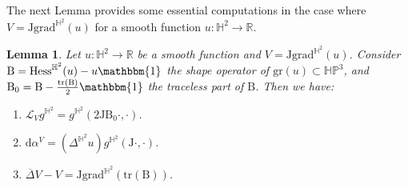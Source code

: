 \documentclass[10pt]{amsart}
\theoremstyle{plain}
\newtheorem{lemma}[cor]{Lemma}
\theoremstyle{definition}
\newcommand{\HP}{\mathbb{HP}^3}
\newcommand{\grad}{\mathrm{grad}^{\mathbb{H}^2}}
\newcommand{\hess}{\mathrm{Hess}^{\mathbb{H}^2}}
\newcommand{\J}{\mathrm{J}}
\newcommand{\B}{\mathrm{B}}
\begin{document}
The next Lemma provides some essential computations in the case where \(V = \J \grad(u) \) for a smooth function \(u : \mathbb{H}^2 \to \mathbb{R} \).
\begin{lemma}\label{Lie_derivative_of_Ju}
Let $u:\mathbb{H}^2\to\mathbb{R}$ be a smooth function and $V=\J\grad(u)$. Consider $\B=\hess(u)-u\mathbbm{1}$ the shape operator of $\mathrm{gr}(u)\subset\HP$, and $\B_0=\B-\frac{\mathrm{tr}(\B)}{2}\mathbbm{1}$ the traceless part of $\B$. Then we have:
\begin{enumerate}
\item \label{1Lie_derivative_of_Ju} $\mathcal{L}_Vg^{\mathbb{H}^2}=g^{\mathbb{H}^2}(2\J\B_0\cdot,\cdot)$.
\item \label{2Lie_derivative_of_Ju} $\mathrm{d}\alpha^V=(\Delta^{\mathbb{H}^2} u) g^{\mathbb{H}^2}(\J\cdot,\cdot)$.
\item \label{3Lie_derivative_of_Ju} $
\overline{\Delta}V-V=\J\grad\left(\mathrm{tr}(\B) \right)$.
\end{enumerate}
\end{lemma}
\end{document}
